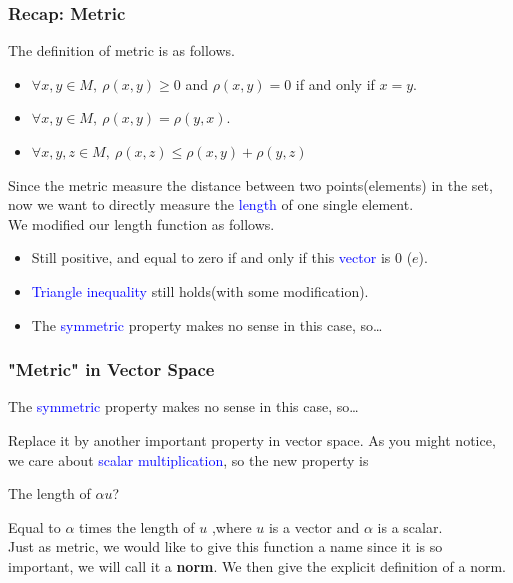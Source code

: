 \documentclass{beamer}
\begin{document}
\begin{frame}
    \frametitle{Recap: Metric}
The definition of metric is as follows.
\vspace{1em}
\begin{itemize}
    \item $\forall x,y\in M,\ \rho (x,y) \geq 0$ and $\rho (x,y)=0$ if and only if $x=y$.
    \item  $\forall x,y\in M,\ \rho (x,y)=\rho (y,x)$.
    \item  $\forall x,y,z\in M,\ \rho (x,z)\leq \rho (x,y)+\rho (y,z)$
\end{itemize}
\hspace{1em}
Since the metric measure the distance between two points(elements) in the set, now we want to directly measure the \textcolor{blue}{length} of one single element.\\
\vspace{1em}
\hspace{1em}
We modified our length function as follows.
\begin{itemize}
    \item Still positive, and equal to zero if and only if this \textcolor{blue}{vector} is 0 ($e$).
    \item \textcolor{blue}{Triangle inequality} still holds(with some modification).
    \item The \textcolor{blue}{symmetric} property makes no sense in this case, so\dots
\end{itemize}
    
\end{frame}
\begin{frame}
    \frametitle{"Metric" in Vector Space}
\begin{center}
    \hspace{1em} The \textcolor{blue}{symmetric} property makes no sense in this case, so\dots
\end{center}

    \hspace{1em}Replace it by another important property in vector space. As you might notice, we care about \textcolor{blue}{scalar multiplication}, so the new property is 
\begin{center}
    The length of $\alpha u$? 
\end{center}

\hspace{1em}Equal to $\alpha$ times the length of $u$
,where $u$ is a vector and $\alpha$ is a scalar. \\ \vspace{0.5em}\hspace{1em}Just as metric, we would like to give this function a name since it is so important, 
we will call it a \textbf{norm}. We then give the explicit definition of a norm.
\end{frame}
\end{document}
